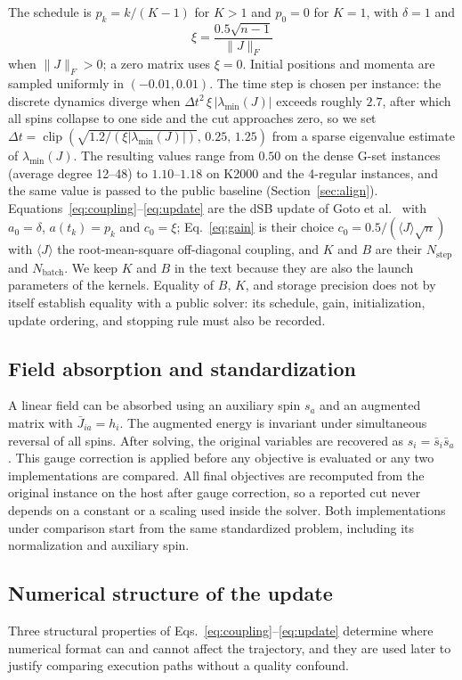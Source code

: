 \documentclass[11pt,a4paper]{article}
\begin{document}
The schedule is $p_k=k/(K-1)$ for $K>1$ and $p_0=0$ for $K=1$, with $\delta=1$ and
\begin{equation}
 \xi=\frac{0.5\sqrt{n-1}}{\|J\|_F}
 \label{eq:gain}
\end{equation}
when $\|J\|_F>0$; a zero matrix uses $\xi=0$. Initial positions and momenta are sampled uniformly in $(-0.01,0.01)$. The time step is chosen per instance: the discrete dynamics diverge when $\Delta t^2\,\xi\,|\lambda_{\min}(J)|$ exceeds roughly $2.7$, after which all spins collapse to one side and the cut approaches zero, so we set $\Delta t=\operatorname{clip}(\sqrt{1.2/(\xi|\lambda_{\min}(J)|)},\,0.25,\,1.25)$ from a sparse eigenvalue estimate of $\lambda_{\min}(J)$. The resulting values range from $0.50$ on the dense G-set instances (average degree 12--48) to $1.10$--$1.18$ on K2000 and the 4-regular instances, and the same value is passed to the public baseline (Section~\ref{sec:align}). Equations~\eqref{eq:coupling}--\eqref{eq:update} are the dSB update of Goto et al.~\cite{goto2021} with $a_0=\delta$, $a(t_k)=p_k$ and $c_0=\xi$; Eq.~\eqref{eq:gain} is their choice $c_0=0.5/(\langle J\rangle\sqrt n)$ with $\langle J\rangle$ the root-mean-square off-diagonal coupling, and $K$ and $B$ are their $N_{\mathrm{step}}$ and $N_{\mathrm{batch}}$. We keep $K$ and $B$ in the text because they are also the launch parameters of the kernels. Equality of $B$, $K$, and storage precision does not by itself establish equality with a public solver: its schedule, gain, initialization, update ordering, and stopping rule must also be recorded.

\subsection{Field absorption and standardization}\label{sec:lifting}
A linear field can be absorbed using an auxiliary spin $s_a$ and an augmented matrix with $\bar J_{ia}=h_i$. The augmented energy is invariant under simultaneous reversal of all spins. After solving, the original variables are recovered as $s_i=\bar s_i\bar s_a$. This gauge correction is applied before any objective is evaluated or any two implementations are compared. All final objectives are recomputed from the original instance on the host after gauge correction, so a reported cut never depends on a constant or a scaling used inside the solver. Both implementations under comparison start from the same standardized problem, including its normalization and auxiliary spin.

\subsection{Numerical structure of the update}\label{sec:numstruct}
Three structural properties of Eqs.~\eqref{eq:coupling}--\eqref{eq:update} determine where numerical format can and cannot affect the trajectory, and they are used later to justify comparing execution paths without a quality confound.
\end{document}
